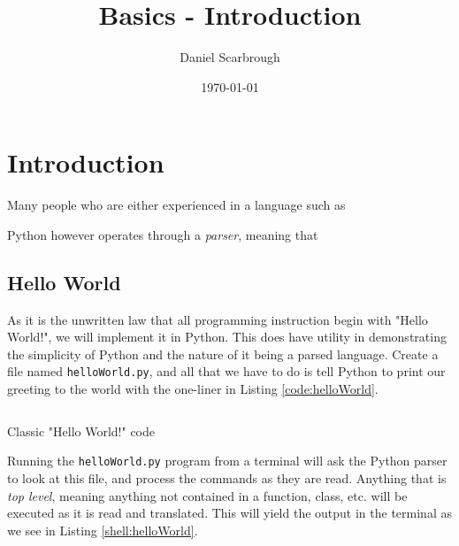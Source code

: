 \documentclass{book}
\title{Basics - Introduction}
\author{Daniel Scarbrough}
\date{\today}
\newcommand{\python}[3]{
    \usemintedstyle{autumn}
    \begin{listing}[ht]
        \begin{mdframed}[backgroundcolor=codebg]
            \inputminted[linenos]{python}{#1}
        \end{mdframed}
        \caption{#2}
        \label{#3}
    \end{listing}
}
\begin{document}
\maketitle

\tableofcontents

\chapter{Introduction}



Many people who are either experienced in a language such as

Python however operates through a \textit{parser}, meaning that

\section{Hello World}

As it is the unwritten law that all programming instruction begin with "Hello World!", we will implement it in Python. This does have utility in demonstrating the simplicity of Python and the nature of it being a parsed language. Create a file named \texttt{helloWorld.py}, and all that we have to do is tell Python to print our greeting to the world with the one-liner in Listing \ref{code:helloWorld}.

\python{../../../docCode/chapter1/helloWorld.py}
       {Classic "Hello World!" code}
       {code:helloWorld}

Running the \texttt{helloWorld.py} program from a terminal will ask the Python parser to look at this file, and process the commands as they are read. Anything that is \textit{top level}, meaning anything not contained in a function, class, etc. will be executed as it is read and translated. This will yield the output in the terminal as we see in Listing \ref{shell:helloWorld}.
\end{document}

